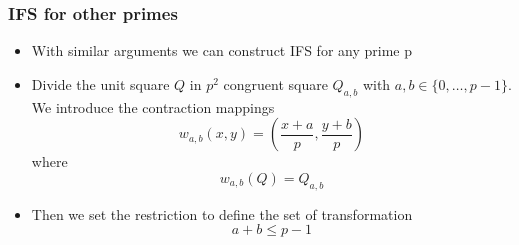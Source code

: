 \documentclass{beamer}
\begin{document}
\begin{frame}
    \frametitle{IFS for other primes}
    \begin{itemize}
        \item With similar arguments we can construct IFS for any prime p
        \item Divide the unit square $Q$ in $p^2$ congruent square $Q_{a,b}$ with $a,b \in \{0,\dots,p-1\}$. We introduce the contraction mappings 
        \begin{equation*}
            w_{a,b}(x,y) = \left(\frac{x+a}{p}, \frac{y+b}{p}\right)
        \end{equation*} 
        where 
        \begin{equation*}
            w_{a,b}(Q) = Q_{a,b}
        \end{equation*}
        \item Then we set the restriction to define the set of transformation
        \begin{equation*}
            a+b \leq p-1
        \end{equation*}
        
    \end{itemize}
\end{frame}
\end{document}
